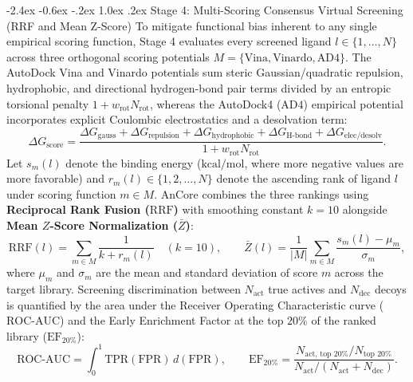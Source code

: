 \documentclass[11pt,a4paper]{article}
\makeatletter
\renewcommand{\subsection}{\@startsection{subsection}{2}{\z@}%
  {-2.4ex \@plus -0.6ex \@minus -.2ex}%
  {1.0ex \@plus .2ex}%
  {\normalfont\large\bfseries\color{primary}}}
\makeatother
\begin{document}
\subsection{Stage 4: Multi-Scoring Consensus Virtual Screening (RRF and Mean Z-Score)}
\noindent To mitigate functional bias inherent to any single empirical scoring function, Stage 4 evaluates every screened ligand $l \in \{1, \dots, N\}$ across three orthogonal scoring potentials $M = \{\text{Vina}, \text{Vinardo}, \text{AD4}\}$. The AutoDock Vina and Vinardo potentials sum steric Gaussian/quadratic repulsion, hydrophobic, and directional hydrogen-bond pair terms divided by an entropic torsional penalty $1 + w_{\text{rot}} N_{\text{rot}}$, whereas the AutoDock4 ($\text{AD4}$) empirical potential incorporates explicit Coulombic electrostatics and a desolvation term:
\begin{equation}
\Delta G_{\text{score}} = \frac{\Delta G_{\text{gauss}} + \Delta G_{\text{repulsion}} + \Delta G_{\text{hydrophobic}} + \Delta G_{\text{H-bond}} + \Delta G_{\text{elec/desolv}}}{1 + w_{\text{rot}} N_{\text{rot}}}.
\label{eq:vina}
\end{equation}
Let $s_m(l)$ denote the binding energy ($\text{kcal/mol}$, where more negative values are more favorable) and $r_m(l) \in \{1, 2, \dots, N\}$ denote the ascending rank of ligand $l$ under scoring function $m \in M$. AnCore combines the three rankings using \textbf{Reciprocal Rank Fusion ($\text{RRF}$)} with smoothing constant $k = 10$ alongside \textbf{Mean $Z$-Score Normalization ($\bar{Z}$)}:
\begin{equation}
\text{RRF}(l) = \sum_{m \in M} \frac{1}{k + r_m(l)} \quad (k = 10), \qquad
\bar{Z}(l) = \frac{1}{|M|} \sum_{m \in M} \frac{s_m(l) - \mu_m}{\sigma_m},
\label{eq:rrf}
\end{equation}
where $\mu_m$ and $\sigma_m$ are the mean and standard deviation of score $m$ across the target library. Screening discrimination between $N_{\text{act}}$ true actives and $N_{\text{dec}}$ decoys is quantified by the area under the Receiver Operating Characteristic curve ($\text{ROC-AUC}$) and the Early Enrichment Factor at the top $20\%$ of the ranked library ($\text{EF}_{20\%}$):
\begin{equation}
\text{ROC-AUC} = \int_{0}^{1} \text{TPR}(\text{FPR})\,d(\text{FPR}), \qquad
\text{EF}_{20\%} = \frac{N_{\text{act, top }20\%} / N_{\text{top }20\%}}{N_{\text{act}} / (N_{\text{act}} + N_{\text{dec}})}.
\label{eq:roc}
\end{equation}
\end{document}
